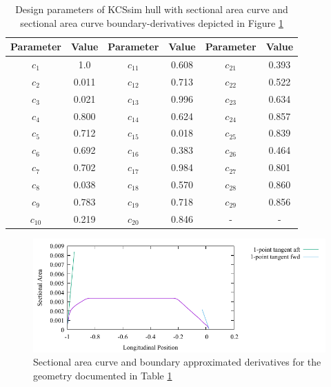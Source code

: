 \documentclass{report}
\begin{document}
\begin{table}[H]
    \centering
    \begin{tabular}{|c|c|c|c|c|c|}
        \hline 
        Parameter & Value & Parameter & Value & Parameter & Value\\
        \hline 
        $c_1$ & 1.0 & $c_{11}$ & 0.608 & $c_{21}$ & 0.393 \\
        \hline 
        $c_2$ & 0.011 & $c_{12}$ & 0.713 & $c_{22}$ & 0.522\\
        \hline 
        $c_3$ & 0.021 & $c_{13}$ & 0.996 & $c_{23}$ & 0.634 \\
        \hline 
        $c_4$ & 0.800 & $c_{14}$ & 0.624 & $c_{24}$ & 0.857 \\
        \hline 
        $c_5$ & 0.712 & $c_{15}$ & 0.018 & $c_{25}$ & 0.839 \\
        \hline 
        $c_6$ & 0.692 & $c_{16}$ & 0.383 & $c_{26}$ & 0.464 \\
        \hline 
        $c_7$ & 0.702 & $c_{17}$ & 0.984 & $c_{27}$ & 0.801 \\
        \hline 
        $c_8$ & 0.038 & $c_{18}$ & 0.570 & $c_{28}$ & 0.860 \\
        \hline 
        $c_9$ & 0.783 & $c_{19}$ & 0.718 & $c_{29}$ & 0.856 \\
        \hline 
        $c_{10}$ & 0.219 & $c_{20}$ & 0.846 & - & - \\
        \hline 
    \end{tabular}
    \caption{Design parameters of KCSsim hull with sectional area curve and 
    sectional area curve boundary-derivatives depicted in Figure
    \ref{fig:test-4-sac-14}}
    \label{tab:test-4-14}
\end{table}
\begin{figure}[H]
    \centering
    \includegraphics[width = 0.7\linewidth]{figures/test-4-sac-14.pdf}
    \caption{Sectional area curve and boundary approximated derivatives for
    the geometry documented in Table \ref{tab:test-4-14}}
    \label{fig:test-4-sac-14}
\end{figure}
\end{document}
